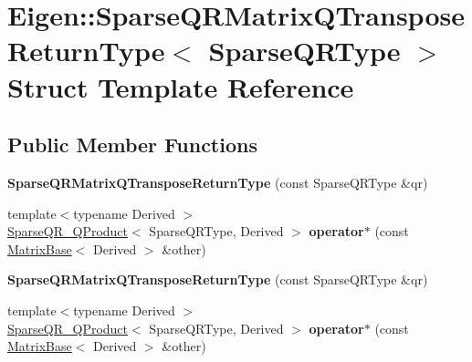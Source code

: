 \hypertarget{struct_eigen_1_1_sparse_q_r_matrix_q_transpose_return_type}{}\section{Eigen\+:\+:Sparse\+Q\+R\+Matrix\+Q\+Transpose\+Return\+Type$<$ Sparse\+Q\+R\+Type $>$ Struct Template Reference}
\label{struct_eigen_1_1_sparse_q_r_matrix_q_transpose_return_type}
\subsection*{Public Member Functions}
\begin{DoxyCompactItemize}
\item 
\mbox{\label{struct_eigen_1_1_sparse_q_r_matrix_q_transpose_return_type_aab227f4e109f500eb2d9d2edfe926993}} 
{\bfseries Sparse\+Q\+R\+Matrix\+Q\+Transpose\+Return\+Type} (const Sparse\+Q\+R\+Type \&qr)
\item 
\mbox{\label{struct_eigen_1_1_sparse_q_r_matrix_q_transpose_return_type_a0a707ed1f530311e0ac999fc53cde285}} 
{\footnotesize template$<$typename Derived $>$ }\\\hyperlink{struct_eigen_1_1_sparse_q_r___q_product}{Sparse\+Q\+R\+\_\+\+Q\+Product}$<$ Sparse\+Q\+R\+Type, Derived $>$ {\bfseries operator$\ast$} (const \hyperlink{group___core___module_class_eigen_1_1_matrix_base}{Matrix\+Base}$<$ Derived $>$ \&other)
\item 
\mbox{\label{struct_eigen_1_1_sparse_q_r_matrix_q_transpose_return_type_aab227f4e109f500eb2d9d2edfe926993}} 
{\bfseries Sparse\+Q\+R\+Matrix\+Q\+Transpose\+Return\+Type} (const Sparse\+Q\+R\+Type \&qr)
\item 
\mbox{\label{struct_eigen_1_1_sparse_q_r_matrix_q_transpose_return_type_a0a707ed1f530311e0ac999fc53cde285}} 
{\footnotesize template$<$typename Derived $>$ }\\\hyperlink{struct_eigen_1_1_sparse_q_r___q_product}{Sparse\+Q\+R\+\_\+\+Q\+Product}$<$ Sparse\+Q\+R\+Type, Derived $>$ {\bfseries operator$\ast$} (const \hyperlink{group___core___module_class_eigen_1_1_matrix_base}{Matrix\+Base}$<$ Derived $>$ \&other)
\end{DoxyCompactItemize}
